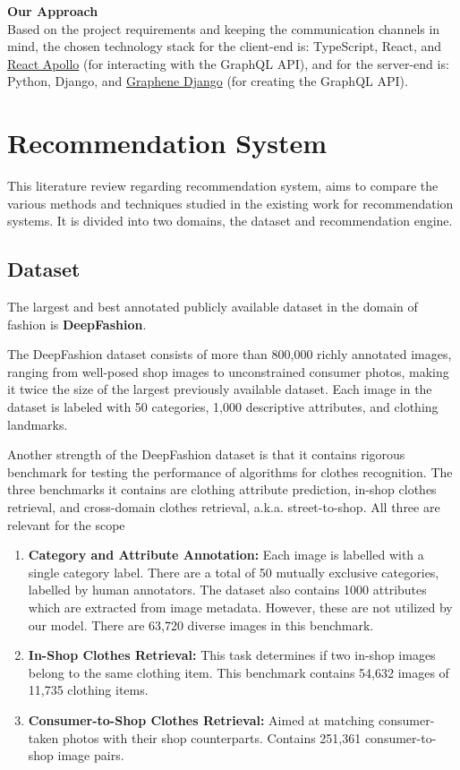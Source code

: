 \textbf{Our Approach}\\
Based on the project requirements and keeping the communication channels in mind, the chosen technology stack for the client-end is: TypeScript, React, and \href{https://github.com/apollographql/react-apollo}{React Apollo} (for interacting with the GraphQL API), and for the server-end is: Python, Django, and \href{https://github.com/graphql-python/graphene-django}{Graphene Django} (for creating the GraphQL API).

\section{Recommendation System}
This literature review regarding recommendation system, aims to compare the various methods and techniques studied in the existing work for recommendation systems. It is divided into two domains, the dataset and recommendation engine.

\subsection{Dataset}
The largest and best annotated publicly available dataset in the domain of fashion is \textbf{DeepFashion}.

The DeepFashion dataset consists of more than 800,000 richly annotated images, ranging from well-posed shop images to unconstrained consumer photos, making it twice the size of the largest previously available dataset. Each image in the dataset is labeled with 50 categories, 1,000 descriptive attributes, and clothing landmarks.

Another strength of the DeepFashion dataset is that it contains rigorous benchmark for testing the performance of algorithms for clothes recognition. The three benchmarks it contains are clothing attribute prediction, in-shop clothes retrieval, and cross-domain clothes retrieval, a.k.a. street-to-shop. All three are relevant for the scope 

\begin{enumerate}
	\item \textbf{Category and Attribute Annotation:} Each image is labelled with a single category label. There are a total of 50 mutually exclusive categories, labelled by human annotators. The dataset also contains 1000 attributes which are extracted from image metadata. However, these are not utilized by our model. There are 63,720 diverse images in this benchmark.
	
	\item \textbf{In-Shop Clothes Retrieval:} This task determines if two in-shop images belong to the same clothing item. This benchmark contains 54,632 images of 11,735 clothing items.  
	
	\item \textbf{Consumer-to-Shop Clothes Retrieval:} Aimed at matching consumer-taken photos with their shop counterparts. Contains 251,361 consumer-to-shop image pairs.
\end{enumerate}

